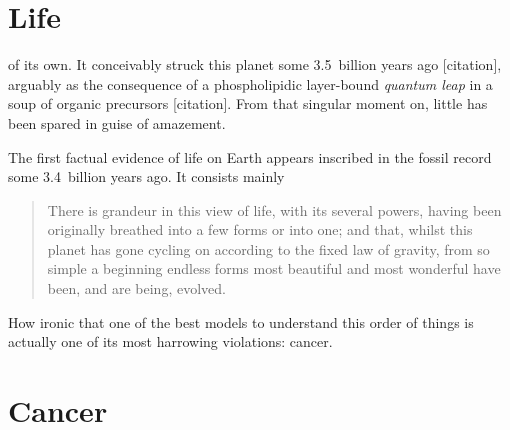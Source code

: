\documentclass{tufte-book}
\begin{document}
\section{Life}

 of its own.  It conceivably struck this planet some
3.5~billion years ago [citation], arguably as the consequence of a phospholipidic
layer-bound \emph{quantum leap} in a soup of organic precursors
[citation].  From that singular moment on, little has been spared in guise of
amazement.

The first factual evidence of life on Earth appears inscribed in the fossil
record some 3.4~billion years ago.  It consists mainly

\begin{quotation}
  There is grandeur in this view of life, with its several powers, having been
  originally breathed into a few forms or into one; and that, whilst this planet
  has gone cycling on according to the fixed law of gravity, from so simple a
  beginning endless forms most beautiful and most wonderful have been, and are
  being, evolved.
\end{quotation}

How ironic that one of the best models to understand this order of things is
actually one of its most harrowing violations: cancer.

\section{Cancer}
\end{document}
